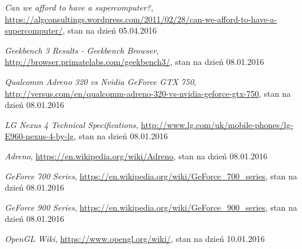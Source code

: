 \begin{thebibliography}{999}
 \emph{Can we afford to have a supercomputer?}, \linebreak \href{https://algconsultings.wordpress.com/2011/02/28/can-we-afford-to-have-a-supercomputer/}{https://algconsultings.wordpress.com/2011/02/28/can-we-afford-to-have-a-supercomputer/}, stan na dzień 05.04.2016

 \emph{Geekbench 3 Results - Geekbench Browser}, \href{http://browser.primatelabs.com/geekbench3/}{http://browser.primatelabs.com/geekbench3/}, stan na dzień 08.01.2016

 \emph{Qualcomm Adreno 320 vs Nvidia GeForce GTX 750}, \href{http://versus.com/en/qualcomm-adreno-320-vs-nvidia-geforce-gtx-750}{http://versus.com/en/qualcomm-adreno-320-vs-nvidia-geforce-gtx-750}, stan na dzień 08.01.2016

 \emph{LG Nexus 4 Technical Specifications}, \href{http://www.lg.com/uk/mobile-phones/lg-E960-nexus-4-by-lg}{http://www.lg.com/uk/mobile-phones/lg-E960-nexus-4-by-lg}, stan na dzień 08.01.2016

 \emph{Adreno}, \href{https://en.wikipedia.org/wiki/Adreno}{https://en.wikipedia.org/wiki/Adreno}, stan na dzień 08.01.2016

 \emph{GeForce 700 Series}, \href{https://en.wikipedia.org/wiki/GeForce_700_series}{https://en.wikipedia.org/wiki/GeForce\_700\_series}, stan na dzień 08.01.2016

 \emph{GeForce 900 Series}, \href{https://en.wikipedia.org/wiki/GeForce_900_series}{https://en.wikipedia.org/wiki/GeForce\_900\_series}, stan na dzień 08.01.2016

 \emph{OpenGL Wiki}, \href{https://www.opengl.org/wiki/}{https://www.opengl.org/wiki/}, stan na dzień 10.01.2016


\end{thebibliography}

